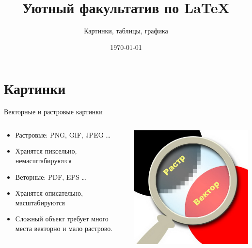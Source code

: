 \documentclass[aspectratio=169]{beamer} %
\title{Уютный факультатив по \LaTeX}
\subtitle{Картинки, таблицы, графика}
\date{\today}
\begin{document}
\maketitle
 
\section{Картинки} 

\begin{frame}{Векторные и растровые картинки} 
\begin{columns}
\begin{column}{.55\linewidth}
\begin{itemize}
\item Растровые: PNG, GIF, JPEG \ldots
\item Хранятся пиксельно, немасштабируются
\item Веторные: PDF, EPS \ldots
\item Хранятся описательно, масштабируются
\item Сложный объект требует много места векторно и мало растрово.
\end{itemize}
\end{column}
\begin{column}{.42\linewidth}
\includegraphics[width=0.99\linewidth]{rv.jpg}
\end{column}
\end{columns}
\end{frame}
\end{document}

